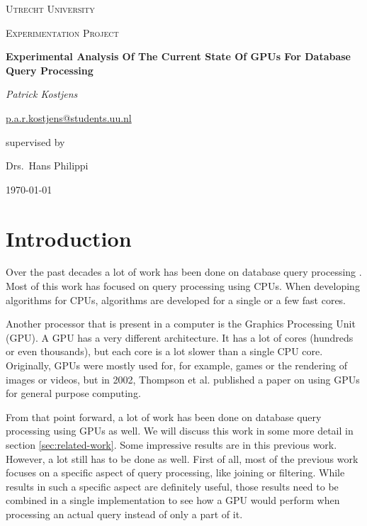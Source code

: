 \documentclass[a4paper,titlepage]{article}
\begin{document}
\begin{titlepage}
	\centering
	{\scshape\LARGE Utrecht University \par}
	\vspace{1cm}
	{\scshape\Large Experimentation Project \par}
	\vspace{1.5cm}
	{\huge\bfseries Experimental Analysis Of The Current State Of GPUs For Database Query Processing\par}
	\vspace{2cm}
	
	{\Large\itshape Patrick Kostjens \par}
	\href{mailto:p.a.r.kostjens@students.uu.nl}{p.a.r.kostjens@students.uu.nl}
	\vfill
	
	supervised by\par
	Drs.~Hans Philippi
	\vfill

	{\large \today\par}
\end{titlepage}

\begin{abstract}

\textbf{Keywords:} query processing, graphics processing unit, relational database, parallel processing, CUDA
\end{abstract}

\section{Introduction}
Over the past decades a lot of work has been done on database query processing \cite{selinger1979,king1981,bratbergsengen1984}. Most of this work has focused on query processing using CPUs. When developing algorithms for CPUs, algorithms are developed for a single or a few fast cores.

Another processor that is present in a computer is the Graphics Processing Unit (GPU). A GPU has a very different architecture. It has a lot of cores (hundreds or even thousands), but each core is a lot slower than a single CPU core. Originally, GPUs were mostly used for, for example, games or the rendering of images or videos, but in 2002, Thompson et al. \cite{thompson2002} published a paper on using GPUs for general purpose computing.

From that point forward, a lot of work has been done on database query processing using GPUs as well. We will discuss this work in some more detail in section \ref{sec:related-work}. Some impressive results are in this previous work. However, a lot still has to be done as well. First of all, most of the previous work focuses on a specific aspect of query processing, like joining or filtering. While results in such a specific aspect are definitely useful, those results need to be combined in a single implementation to see how a GPU would perform when processing an actual query instead of only a part of it.
\end{document}
